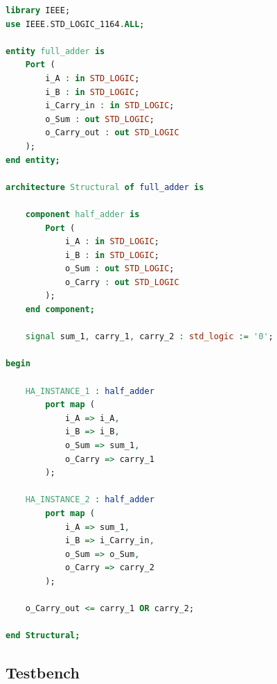 \documentclass[12pt]{article}
\begin{document}
\begin{lstlisting}[language=VHDL]
library IEEE;
use IEEE.STD_LOGIC_1164.ALL;

entity full_adder is
    Port (
        i_A : in STD_LOGIC;
        i_B : in STD_LOGIC;
        i_Carry_in : in STD_LOGIC;
        o_Sum : out STD_LOGIC;
        o_Carry_out : out STD_LOGIC
    );
end entity;

architecture Structural of full_adder is

    component half_adder is
        Port (
            i_A : in STD_LOGIC;
            i_B : in STD_LOGIC;
            o_Sum : out STD_LOGIC;
            o_Carry : out STD_LOGIC
        );
    end component;

    signal sum_1, carry_1, carry_2 : std_logic := '0';

begin

    HA_INSTANCE_1 : half_adder
        port map (
            i_A => i_A,
            i_B => i_B,
            o_Sum => sum_1,
            o_Carry => carry_1
        );

    HA_INSTANCE_2 : half_adder
        port map (
            i_A => sum_1,
            i_B => i_Carry_in,
            o_Sum => o_Sum,
            o_Carry => carry_2
        );

    o_Carry_out <= carry_1 OR carry_2;

end Structural;
\end{lstlisting}

\subsection*{Testbench}
\end{document}
